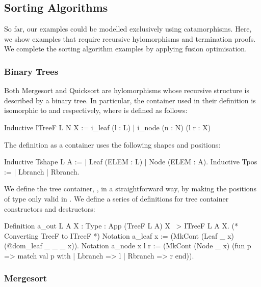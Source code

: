 \documentclass[anonymous, a4paper, UKenglish, cleveref, autoref, thm-restate]{lipics-v2021}
\begin{document}
\subsection{Sorting Algorithms}

So far, our examples could be modelled exclusively using catamorphisms. Here,
we show examples that require recursive hylomorphisms and termination proofs.
We complete the sorting algorithm examples by applying fusion optimisation.

\subsubsection{Binary Trees}

Both Mergesort and Quicksort are hylomorphisms whose recursive structure is
described by a binary tree. In particular, the container used in their
definition is isomorphic to  and 
 respectively, where  is defined as follows:
\begin{coqcode}
Inductive ITreeF L N X := i_leaf (l : L) | i_node (n : N) (l r : X)
\end{coqcode}
The definition as a container uses the following shapes and positions:
\begin{coqcode}
Inductive Tshape L A := | Leaf (ELEM : L) | Node (ELEM : A).
Inductive Tpos := | Lbranch | Rbranch. 
\end{coqcode}
We define the tree container, , in a straightforward way, by making
the positions of type  only valid in .
We define a series of definitions for tree container constructors and 
destructors:
\begin{coqcode}
Definition a_out {L A X : Type} : App (TreeF L A) X ~> ITreeF L A X.
(* Converting TreeF to ITreeF *)
Notation a_leaf x := (MkCont (Leaf _ x) (@dom_leaf _ _ _ x)).
Notation a_node x l r := (MkCont (Node _ x)
  (fun p => match val p with | Lbranch => l | Rbranch => r end)).
\end{coqcode}

\subsubsection{Mergesort}
\end{document}
